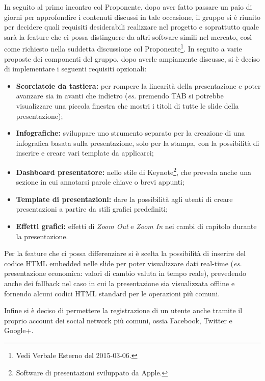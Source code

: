 In seguito al primo incontro col Proponente, dopo aver fatto passare un paio di giorni per approfondire i contenuti discussi in tale occasione, il gruppo si è riunito per decidere quali requisiti desiderabili realizzare nel progetto \PROGETTO{} e soprattutto quale sarà la feature che ci possa distinguere da altri software simili nel mercato, così come richiesto nella suddetta discussione col Proponente\footnote{Vedi Verbale Esterno del 2015-03-06.}.
In seguito a varie proposte dei componenti del gruppo, dopo averle ampiamente discusse, si è deciso di implementare i seguenti requisiti opzionali:
\begin{itemize}
	\item \textbf{Scorciatoie da tastiera:} per rompere la linearità della presentazione e poter avanzare sia in avanti che indietro (\textit{es.} premendo TAB si potrebbe visualizzare una piccola finestra che mostri i titoli di tutte le slide della presentazione);
	\item \textbf{Infografiche:} sviluppare uno strumento separato per la creazione di una infografica basata sulla presentazione, solo per la stampa, con la possibilità di inserire e creare vari template da applicarci;
	\item \textbf{Dashboard presentatore:}  nello stile di Keynote\footnote{Software di presentazioni sviluppato da Apple.}, che preveda anche una sezione in cui annotarsi parole chiave o brevi appunti;
	\item \textbf{Template di presentazioni:} dare la possibilità agli utenti di creare presentazioni a partire da stili grafici predefiniti;
	\item \textbf{Effetti grafici:} effetti di \textit{Zoom Out} e \textit{Zoom In} nei cambi di capitolo durante la presentazione.
\end{itemize}

\noindent Per la feature che ci possa differenziare si è scelta la possibilità di inserire del codice HTML embedded nelle slide per poter visualizzare dati real-time (\textit{es.} presentazione economica: valori di cambio valuta in tempo reale), prevedendo anche dei fallback nel caso in cui la presentazione sia visualizzata offline e fornendo alcuni codici HTML standard per le operazioni più comuni.

\noindent Infine si è deciso di permettere la registrazione di un utente anche tramite il proprio account dei social network più comuni, ossia Facebook, Twitter e Google+. 